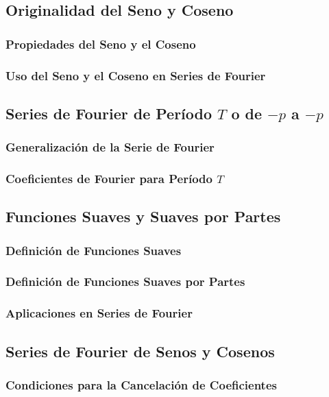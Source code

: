 \subsection{Originalidad del Seno y Coseno}
\subsubsection{Propiedades del Seno y el Coseno}
\subsubsection{Uso del Seno y el Coseno en Series de Fourier}

\subsection{Series de Fourier de Período $T$ o de $-p$ a $-p$}
\subsubsection{Generalización de la Serie de Fourier}
\subsubsection{Coeficientes de Fourier para Período $T$}

\subsection{Funciones Suaves y Suaves por Partes}
\subsubsection{Definición de Funciones Suaves}
\subsubsection{Definición de Funciones Suaves por Partes}
\subsubsection{Aplicaciones en Series de Fourier}

\subsection{Series de Fourier de Senos y Cosenos}
\subsubsection{Condiciones para la Cancelación de Coeficientes}
